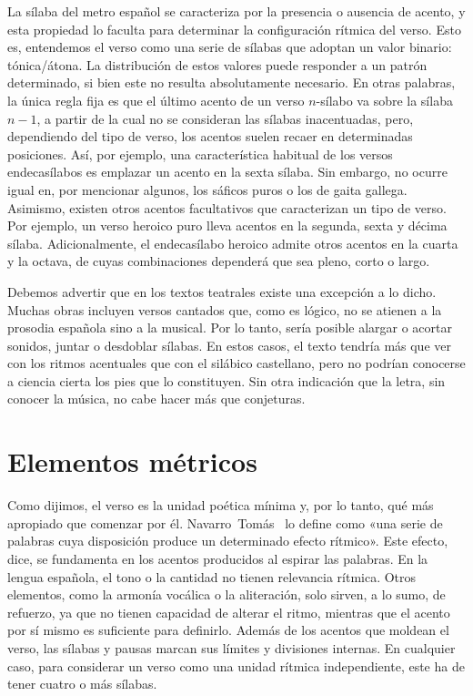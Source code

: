 La sílaba del metro español se caracteriza por la presencia o ausencia de acento, y esta propiedad lo faculta para determinar la configuración rítmica del verso. Esto es, entendemos el verso como una serie de sílabas que adoptan un valor binario: tónica/átona. La distribución de estos valores puede responder a un patrón determinado, si bien este no resulta absolutamente necesario. En otras palabras, la única regla fija es que el último acento de un verso $n$-sílabo va sobre la sílaba $n-1$, a partir de la cual no se consideran las sílabas inacentuadas, pero, dependiendo del tipo de verso, los acentos suelen recaer en determinadas posiciones. Así, por ejemplo, una característica habitual de los versos endecasílabos es emplazar un acento en la sexta sílaba. Sin embargo, no ocurre igual en, por mencionar algunos, los sáficos puros o los de gaita gallega. Asimismo, existen otros acentos facultativos que caracterizan un tipo de verso. Por ejemplo, un verso heroico puro lleva acentos en la segunda, sexta y décima sílaba. Adicionalmente, el endecasílabo heroico admite otros acentos en la cuarta y la octava, de cuyas combinaciones dependerá que sea pleno, corto o largo.

Debemos advertir que en los textos teatrales existe una excepción a lo dicho. Muchas obras incluyen versos cantados que, como es lógico, no se atienen a la prosodia española sino a la musical. Por lo tanto, sería posible alargar o acortar sonidos, juntar o desdoblar sílabas. En estos casos, el texto tendría más que ver con los ritmos acentuales que con el silábico castellano, pero no podrían conocerse a ciencia cierta los pies que lo constituyen. Sin otra indicación que la letra, sin conocer la música, no cabe hacer más que conjeturas.

\section{Elementos métricos}
Como dijimos, el verso es la unidad poética mínima y, por lo tanto, qué más apropiado que comenzar por él. Navarro~Tomás~\parencite*[34-35]{navarrotomas1991} lo define como «una serie de palabras cuya disposición produce un determinado efecto rítmico». Este efecto, dice, se fundamenta en los acentos producidos al espirar las palabras. En la lengua española, el tono o la cantidad no tienen relevancia rítmica. Otros elementos, como la armonía vocálica o la aliteración, solo sirven, a lo sumo, de refuerzo, ya que no tienen capacidad de alterar el ritmo, mientras que el acento por sí mismo es suficiente para definirlo. Además de los acentos que moldean el verso, las sílabas y pausas marcan sus límites y divisiones internas. En cualquier caso, para considerar un verso como una unidad rítmica independiente, este ha de tener cuatro o más sílabas.

